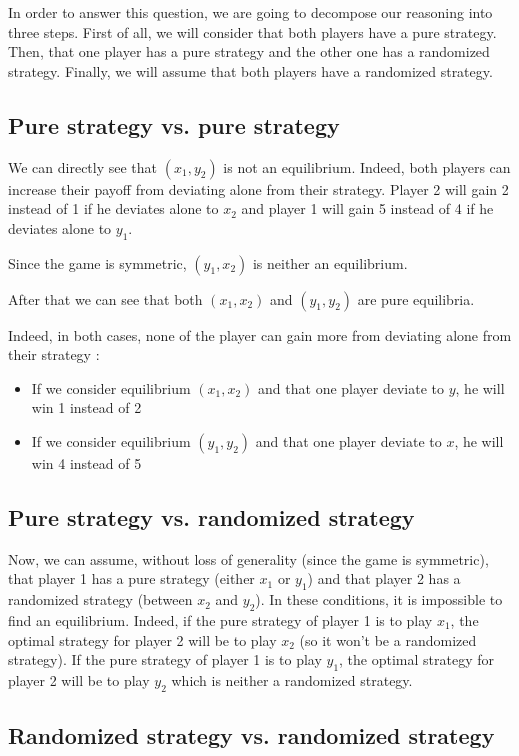 In order to answer this question, we are going to decompose our reasoning into three steps.
First of all, we will consider that both players have a pure strategy. Then, that one player has a pure strategy and the other one has a randomized strategy. Finally, we will assume that both players have a randomized strategy.

\subsection*{Pure strategy vs. pure strategy}

We can directly see that $(x_1, y_2)$ is not an equilibrium. Indeed, both players can increase their payoff from deviating alone from their strategy. Player 2 will gain 2 instead of 1 if he deviates alone to $x_2$ and player 1 will gain 5 instead of 4 if he deviates alone to $y_1$.

Since the game is symmetric, $(y_1, x_2)$ is neither an equilibrium.

After that we can see that both $(x_1, x_2)$ and $(y_1, y_2)$ are pure equilibria.

Indeed, in both cases, none of the player can gain more from deviating alone from their strategy :
\begin{itemize}
	\item If we consider equilibrium $(x_1, x_2)$ and that one player deviate to $y$, he will win 1 instead of 2
	\item If we consider equilibrium $(y_1, y_2)$ and that one player deviate to $x$, he will win 4 instead of 5
\end{itemize}

\subsection*{Pure strategy vs. randomized strategy}

Now, we can assume, without loss of generality (since the game is symmetric), that player 1 has a pure strategy (either $x_1$ or $y_1$) and that player 2 has a randomized strategy (between $x_2$ and $y_2$). In these conditions, it is impossible to find an equilibrium. Indeed, if the pure strategy of player 1 is to play $x_1$, the optimal strategy for player 2 will be to play $x_2$ (so it won't be a randomized strategy). If the pure strategy of player 1 is to play $y_1$, the optimal strategy for player 2 will be to play $y_2$ which is neither a randomized strategy.

\subsection*{Randomized strategy vs. randomized strategy}

